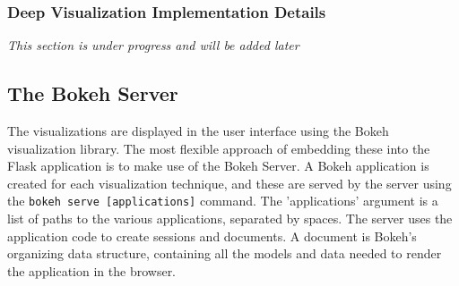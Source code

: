 \subsubsection{Deep Visualization Implementation Details}

\textit{This section is under progress and will be added later}

\subsection{The Bokeh Server}

The visualizations are displayed in the user interface using the Bokeh visualization library. The most flexible approach of embedding these into the Flask application is to make use of the Bokeh Server. A Bokeh application is created for each visualization technique, and these are served by the server using the \texttt{bokeh serve [applications]} command. The 'applications' argument is a list of paths to the various applications, separated by spaces. The server uses the application code to create sessions and documents. A document is Bokeh's organizing data structure, containing all the models and data needed to render the application in the browser.\\

